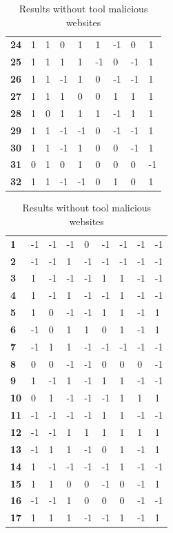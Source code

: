 \documentclass[twoside,openright,notitlepage]{uva-bachelor-thesis}
\begin{document}
\begin{table}[h!]
{\begin{tabular}{lllllllll}
\textbf{24} & 1 & 1  & 0  & 1  & 1  & -1 & 0  & 1  \\
\textbf{25} & 1 & 1  & 1  & 1  & -1 & 0  & -1 & 1  \\
\textbf{26} & 1 & 1  & -1 & 1  & 0  & -1 & -1 & 1  \\
\textbf{27} & 1 & 1  & 1  & 0  & 0  & 1  & 1  & 1  \\
\textbf{28} & 1 & 0  & 1  & 1  & 1  & -1 & 1  & 1  \\
\textbf{29} & 1 & 1  & -1 & -1 & 0  & -1 & -1 & 1  \\
\textbf{30} & 1 & 1  & -1 & 1  & 0  & 0  & -1 & 1  \\
\textbf{31} & 0 & 1  & 0  & 1  & 0  & 0  & 0  & -1 \\
\textbf{32} & 1 & 1  & -1 & -1 & 0  & 1  & 0  & 1 
\end{tabular}
\caption{Results without tool malicious websites}
}
\parbox{.45\linewidth}{
\centering
\begin{tabular}{lllllllll}
\textbf{1}  & -1 & -1 & -1 & 0  & -1 & -1 & -1 & -1 \\
\textbf{2}  & -1 & -1 & 1  & -1 & -1 & -1 & -1 & -1 \\
\textbf{3}  & 1  & -1 & -1 & -1 & 1  & 1  & -1 & -1 \\
\textbf{4}  & 1  & -1 & 1  & -1 & -1 & 1  & -1 & -1 \\
\textbf{5}  & 1  & 0  & -1 & -1 & 1  & 1  & -1 & 1  \\
\textbf{6}  & -1 & 0  & 1  & 1  & 0  & 1  & -1 & 1  \\
\textbf{7}  & -1 & 1  & 1  & -1 & -1 & -1 & -1 & -1 \\
\textbf{8}  & 0  & 0  & -1 & -1 & 0  & 0  & 0  & -1 \\
\textbf{9}  & 1  & -1 & 1  & -1 & 1  & 1  & -1 & -1 \\
\textbf{10} & 0  & 1  & -1 & -1 & -1 & 1  & 1  & 1  \\
\textbf{11} & -1 & -1 & -1 & -1 & 1  & 1  & -1 & -1 \\
\textbf{12} & -1 & -1 & 1  & 1  & 1  & 1  & 1  & 1  \\
\textbf{13} & -1 & 1  & 1  & -1 & 0  & 1  & -1 & 1  \\
\textbf{14} & 1  & -1 & -1 & -1 & -1 & 1  & -1 & -1 \\
\textbf{15} & 1  & 1  & 0  & 0  & -1 & 0  & -1 & 1  \\
\textbf{16} & -1 & -1 & 1  & 0  & 0  & 0  & -1 & -1 \\
\textbf{17} & 1  & 1  & 1  & -1 & -1 & 1  & -1 & 1  \\

\end{tabular}}
\end{table}
\end{document}
